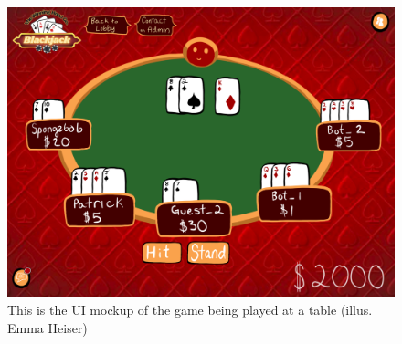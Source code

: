 \begin{figure}[hbt!]
    \centering
    \includegraphics[width=0.75\linewidth]{figures/in-game.png}
    \caption{This is the UI mockup of the game being played at a table (illus. Emma Heiser)}
    \label{fig:game}
\end{figure}

\pagebreak
